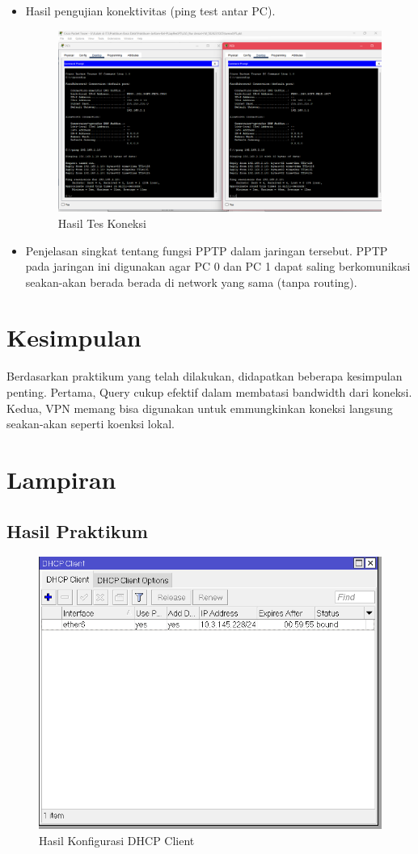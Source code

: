 \begin{enumerate}
\begin{itemize}
    \item Hasil pengujian konektivitas (ping test antar PC).
\begin{figure}[h]
  \centering
  \includegraphics[width=0.5\linewidth]{tumod/ping.png}
  \caption{Hasil Tes Koneksi}
  \label{fig:topologi tumod}
\end{figure}  
  
    \item Penjelasan singkat tentang fungsi PPTP dalam jaringan tersebut.
    PPTP pada jaringan ini digunakan agar PC 0 dan PC 1 dapat saling berkomunikasi seakan-akan berada berada di network yang sama (tanpa routing).
  \end{itemize}
\end{enumerate}

\section{Kesimpulan}
Berdasarkan praktikum yang telah dilakukan, didapatkan beberapa kesimpulan penting. Pertama, Query cukup efektif dalam membatasi bandwidth dari koneksi. Kedua, VPN memang bisa digunakan untuk emmungkinkan koneksi langsung seakan-akan seperti koenksi lokal.

\section{Lampiran}
\subsection{Hasil Praktikum}
\begin{figure}[h]
  \centering
  \includegraphics[width=0.5\linewidth]{dokum/Laptop 2/DHCP CLient.png}
  \caption{Hasil Konfigurasi DHCP Client}
  \label{fig:dhcp-client}
\end{figure}

